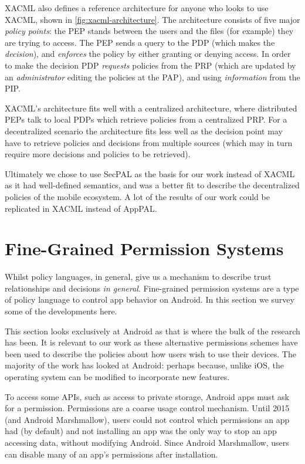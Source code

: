 \documentclass[thesis.tex]{subfiles}
\begin{document}
XACML also defines a reference architecture for anyone who looks to use XACML,
shown in \autoref{fig:xacml-architecture}. The architecture consists of five
major \emph{policy points}: the PEP stands between the users and the files (for
example) they are trying to access. The PEP sends a query to the PDP (which
makes the \emph{decision}), and \emph{enforces} the policy by either granting or
denying access. In order to make the decision PDP \emph{requests} policies from
the PRP (which are updated by an \emph{administrator} editing the policies at
the PAP), and using \emph{information} from the PIP. 

XACML's architecture fits well with a centralized architecture, where
distributed PEPs talk to local PDPs which retrieve policies from a centralized
PRP. For a decentralized scenario the architecture fits less well as the
decision point may have to retrieve policies and decisions from multiple sources
(which may in turn require more decisions and policies to be retrieved).

Ultimately we chose to use SecPAL as the basis for our work instead of XACML as
it had well-defined semantics, and was a better fit to describe the
decentralized policies of the mobile ecosystem. A lot of the results of our work
could be replicated in XACML instead of AppPAL. 


\section{Fine-Grained Permission Systems}
\label{sec:fine-grained-permissions}

Whilst policy languages, in general, give us a mechanism to describe trust
relationships and decisions \emph{in general}. Fine-grained permission
systems are a type of policy language to control app behavior on
Android. In this section we survey some of the developments here.

This section looks exclusively at Android as that is where the bulk of
the research has been. It is relevant to our work as these alternative
permissions schemes have been used to describe the policies about how
users wish to use their devices. The majority of the work has looked
at Android: perhaps because, unlike iOS, the operating system can be
modified to incorporate new features.

To access some APIs, such as access to private storage, Android apps
must ask for a permission. Permissions are a coarse usage control
mechanism. Until 2015 (and Android Marshmallow), users could not
control which permissions an app had (by default) and not installing
an app was the only way to stop an app accessing data, without
modifying Android.  Since Android Marshmallow, users can disable many
of an app's permissions after installation.
\end{document}
